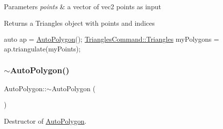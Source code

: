 \begin{DoxyParams}{Parameters}
{\em points} & a vector of vec2 points as input \\
\hline
\end{DoxyParams}
\begin{DoxyReturn}{Returns}
a Triangles object with points and indices 
\begin{DoxyCode}
\textcolor{keyword}{auto} ap = \hyperlink{group____2d_gaa74351ac8f735344958e7b2ac8363bb5}{AutoPolygon}();
\hyperlink{structTrianglesCommand_1_1Triangles}{TrianglesCommand::Triangles} myPolygons = ap.triangulate(myPoints);
\end{DoxyCode}
 
\end{DoxyReturn}
\mbox{\label{group____2d_gaca856dfbfddcb64d3fa29bf261dd10f8}} 
\subsubsection{\texorpdfstring{$\sim$\+Auto\+Polygon()}{~AutoPolygon()}}
{\footnotesize\ttfamily Auto\+Polygon\+::$\sim$\+Auto\+Polygon (\begin{DoxyParamCaption}{ }\end{DoxyParamCaption})}

Destructor of \hyperlink{classAutoPolygon}{Auto\+Polygon}. 